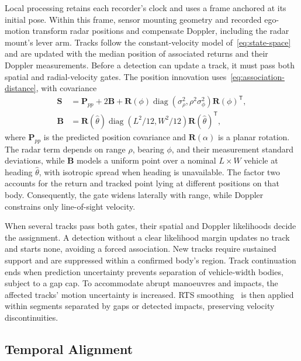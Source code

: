 Local processing retains each recorder's clock and uses a frame anchored
at its initial pose. Within this frame, sensor mounting geometry and
recorded ego-motion transform radar positions and compensate Doppler,
including the radar mount's lever arm. Tracks follow the constant-velocity
model of~\eqref{eq:state-space} and are updated with the median position of
associated returns and their Doppler measurements. Before a detection can
update a track, it must pass both spatial and radial-velocity gates. The
position innovation uses~\eqref{eq:association-distance}, with covariance
\begin{equation}
  \begin{aligned}
    \mathbf{S} &= \mathbf{P}_{pp}+2\mathbf{B}+\mathbf{R}(\phi)\operatorname{diag}
      (\sigma_\rho^2,\rho^2\sigma_\phi^2)\mathbf{R}(\phi)^{\mathsf T},\\
    \mathbf{B} &= \mathbf{R}(\hat\theta)\operatorname{diag}
      (L^2/12,W^2/12)\mathbf{R}(\hat\theta)^{\mathsf T},
  \end{aligned}
  \label{eq:gate}
\end{equation}
where $\mathbf{P}_{pp}$ is the predicted position covariance and
$\mathbf{R}(\alpha)$ is a planar rotation. The radar term depends on range
$\rho$, bearing $\phi$, and their measurement standard deviations, while
$\mathbf{B}$ models a uniform point over a nominal $L\times W$ vehicle at
heading $\hat\theta$, with isotropic spread when heading is unavailable.
The factor two accounts for the return and tracked point lying at different
positions on that body. Consequently, the gate widens laterally with range,
while Doppler constrains only line-of-sight velocity.

When several tracks pass both gates, their spatial and Doppler likelihoods
decide the assignment. A detection without a clear likelihood margin
updates no track and starts none, avoiding a forced association. New
tracks require sustained support and are suppressed within a
confirmed body's region. Track continuation ends when prediction
uncertainty prevents separation of vehicle-width bodies, subject to a gap
cap. To accommodate abrupt manoeuvres and impacts, the affected tracks'
motion uncertainty is increased. RTS smoothing~\cite{rauch1965smoothing}
is then applied within segments separated by gaps or detected impacts,
preserving velocity discontinuities.

\subsection{Temporal Alignment}
\label{subsec:temporal-alignment}

